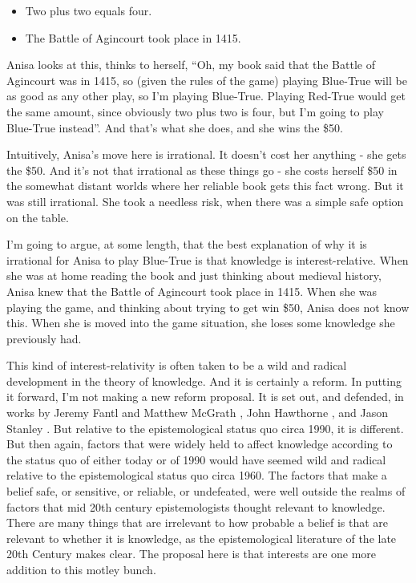 \documentclass[
  11pt,
]{book}
\providecommand{\tightlist}{%
  \setlength{\itemsep}{0pt}\setlength{\parskip}{0pt}}
\begin{document}
\begin{itemize}
\tightlist
\item
  Two plus two equals four.
\item
  The Battle of Agincourt took place in 1415.
\end{itemize}

Anisa looks at this, thinks to herself, ``Oh, my book said that the Battle of Agincourt was in 1415, so (given the rules of the game) playing Blue-True will be as good as any other play, so I'm playing Blue-True. Playing Red-True would get the same amount, since obviously two plus two is four, but I'm going to play Blue-True instead''. And that's what she does, and she wins the \$50.

Intuitively, Anisa's move here is irrational. It doesn't cost her anything - she gets the \$50. And it's not that irrational as these things go - she costs herself \$50 in the somewhat distant worlds where her reliable book gets this fact wrong. But it was still irrational. She took a needless risk, when there was a simple safe option on the table.

I'm going to argue, at some length, that the best explanation of why it is irrational for Anisa to play Blue-True is that knowledge is interest-relative. When she was at home reading the book and just thinking about medieval history, Anisa knew that the Battle of Agincourt took place in 1415. When she was playing the game, and thinking about trying to get win \$50, Anisa does not know this. When she is moved into the game situation, she loses some knowledge she previously had.

This kind of interest-relativity is often taken to be a wild and radical development in the theory of knowledge. And it is certainly a reform. In putting it forward, I'm not making a new reform proposal. It is set out, and defended, in works by Jeremy Fantl and Matthew McGrath \citetext{\citeyear{FantlMcGrath2002}; \citeyear{FantlMcGrath2009}}, John Hawthorne \citeyearpar{Hawthorne2004}, and Jason Stanley \citeyearpar{Stanley2005}. But relative to the epistemological status quo circa 1990, it is different. But then again, factors that were widely held to affect knowledge according to the status quo of either today or of 1990 would have seemed wild and radical relative to the epistemological status quo circa 1960. The factors that make a belief safe, or sensitive, or reliable, or undefeated, were well outside the realms of factors that mid 20th century epistemologists thought relevant to knowledge. There are many things that are irrelevant to how probable a belief is that are relevant to whether it is knowledge, as the epistemological literature of the late 20th Century makes clear. The proposal here is that interests are one more addition to this motley bunch.
\end{document}
